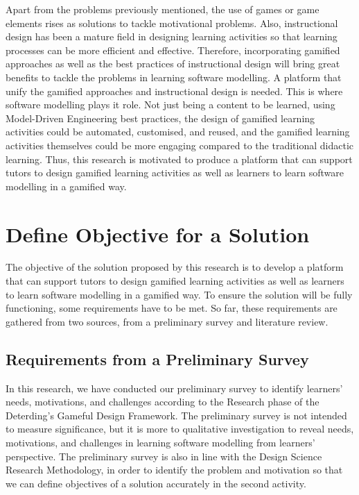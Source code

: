 \documentclass[12pt, a4paper]{report} \usepackage[titletoc]{appendix}
\begin{document}
Apart from the problems previously mentioned, the use of games or game elements rises as solutions to tackle motivational problems. Also, instructional design has been a mature field in designing learning activities so that learning processes can be more efficient and effective. Therefore, incorporating gamified approaches as well as the best practices of instructional design will bring great benefits to tackle the problems in learning software modelling. A platform that unify the gamified approaches and instructional design is needed. This is where software modelling plays it role. Not just being a content to be learned, using Model-Driven Engineering best practices, the design of gamified learning activities could be automated, customised, and reused, and the gamified learning activities themselves could be more engaging compared to the traditional didactic learning. Thus, this research is motivated to produce a platform that can support tutors to design gamified learning activities as well as learners to learn software modelling in a gamified way.


\section{Define Objective for a Solution}
The objective of the solution proposed by this research is to develop a platform that can support tutors to design gamified learning activities as well as learners to learn software modelling in a gamified way. To ensure the solution will be fully functioning, some requirements have to be met. So far, these requirements are gathered from two sources, from a preliminary survey and literature review.

\subsection{Requirements from a Preliminary Survey}
In this research, we have conducted our preliminary survey to identify learners' needs, motivations, and challenges according to the Research phase of the Deterding's Gameful Design Framework. The preliminary survey is not intended to measure significance, but it is more to qualitative investigation to reveal needs, motivations, and challenges in learning software modelling from learners' perspective.    The preliminary survey is also in line with the Design Science Research Methodology, in order to identify the problem and motivation so that we can define objectives of a solution accurately in the second activity. 
\end{document}
